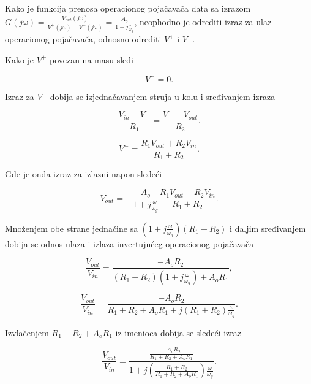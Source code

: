\pagebreak

{Kako je funkcija prenosa operacionog pojačavača data sa izrazom $G(j\omega) = \frac{V_{out}(j\omega)}{V^+(j\omega) - V^-(j\omega)} = \frac{A_o}{1 + j\frac{\omega}{\omega_g}}$, neophodno je odrediti izraz za ulaz operacionog pojačavača, odnosno odrediti $V^+$ i $V^-$.}

{Kako je $V^+$ povezan na masu sledi}

\begin{equation}
    V^+ = 0.
\end{equation}

{Izraz za $V^-$ dobija se izjednačavanjem struja u kolu i sređivanjem izraza}

\begin{equation}
    \frac{V_{in} - V^-}{R_1} = \frac{V^- - V_{out}}{R_2}.
\end{equation}

\begin{equation}
    V^- = \frac{R_1V_{out} + R_2V_{in}}{R_1 + R_2}.
\end{equation}

{Gde je onda izraz za izlazni napon sledeći}

\begin{equation}
    V_{out} = -\frac{A_o}{1 + j\frac{\omega}{\omega_g}} \frac{R_1V_{out} + R_2V_{in}}{R_1 + R_2}.
\end{equation}

{Množenjem obe strane jednačine sa $(1 + j\frac{\omega}{\omega_g})(R_1 + R_2)$ i daljim sređivanjem dobija se odnos ulaza i izlaza invertujućeg operacionog pojačavača}

\begin{equation}
    \frac{V_{out}}{V_{in}} = \frac{-A_oR_2}{(R_1 + R_2)(1 + j\frac{\omega}{\omega_g}) + A_oR_1},
\end{equation}

\begin{equation}
    \frac{V_{out}}{V_{in}} = \frac{-A_oR_2}{R_1 + R_2 + A_oR_1 + j(R_1 + R_2)\frac{\omega}{\omega_g}}.
\end{equation}

{Izvlačenjem $R_1 + R_2 + A_oR_1$ iz imenioca dobija se sledeći izraz}

\begin{equation}
    \frac{V_{out}}{V_{in}} = \frac{\frac{-A_oR_2}{R_1 + R_2 + A_oR_1}}{1 + j(\frac{R_1 + R_2}{R_1 + R_2 + A_oR_1})\frac{\omega}{\omega_g}}.
\end{equation}

